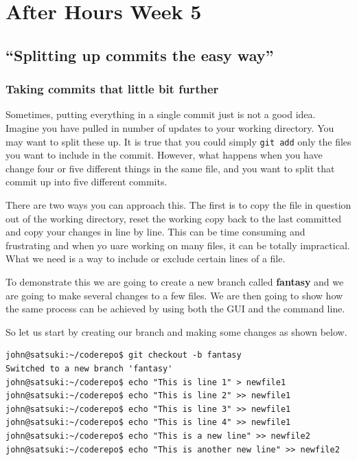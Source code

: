 \chapter{After Hours Week 5}
\section{``Splitting up commits the easy way''}
\subsection{Taking commits that little bit further}

Sometimes, putting everything in a single commit just is not a good idea.  Imagine you have pulled in number of updates to your working directory.  You may want to split these up.  It is true that you could simply \texttt{git add} only the files you want to include in the commit.  However, what happens when you have change four or five different things in the same file, and you want to split that commit up into five different commits.

There are two ways you can approach this.  The first is to copy the file in question out of the working directory, reset the working copy back to the last committed and copy your changes in line by line.  This can be time consuming and frustrating and when yo uare working on many files, it can be totally impractical.  What we need is a way to include or exclude certain lines of a file.

To demonstrate this we are going to create a new branch called \textbf{fantasy} and we are going to make several changes to a few files.  We are then going to show how the same process can be achieved by using both the GUI and the command line.

So let us start by creating our branch and making some changes as shown below.

\begin{Verbatim}
john@satsuki:~/coderepo$ git checkout -b fantasy
Switched to a new branch 'fantasy'
john@satsuki:~/coderepo$ echo "This is line 1" > newfile1 
john@satsuki:~/coderepo$ echo "This is line 2" >> newfile1
john@satsuki:~/coderepo$ echo "This is line 3" >> newfile1
john@satsuki:~/coderepo$ echo "This is line 4" >> newfile1
john@satsuki:~/coderepo$ echo "This is a new line" >> newfile2 
john@satsuki:~/coderepo$ echo "This is another new line" >> newfile2 
\end{Verbatim}


